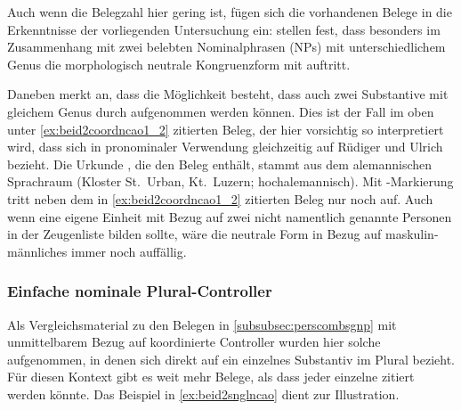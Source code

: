 Auch wenn die Belegzahl hier gering ist, fügen sich die vorhandenen Belege in
die Erkenntnisse der vorliegenden Untersuchung ein:
\textcites[39--40]{behaghel1928}[118]{dal2014} stellen fest, dass besonders im
Zusammenhang mit zwei belebten Nominalphrasen (NPs) mit unterschiedlichem Genus
die morphologisch neutrale Kongruenzform mit  auftritt.

\label{phsec:jungherren}
Daneben merkt \textcite[384]{paul2007} an, dass die Möglichkeit besteht, dass
auch zwei Substantive mit gleichem Genus durch
 aufgenommen werden können. Dies ist der Fall im oben unter
\cref{ex:beid2coordncao1_2} zitierten Beleg, der hier vorsichtig so
interpretiert wird, dass sich   in pronominaler Verwendung
gleichzeitig auf Rüdiger und Ulrich bezieht. Die Urkunde \citet[2915]{cao4},
die den Beleg enthält, stammt aus dem alemannischen Sprachraum (Kloster
St.~Urban, Kt.~Luzern; hochalemannisch). Mit
-Markierung tritt neben dem in \cref{ex:beid2coordncao1_2} zitierten
Beleg nur noch  
\autocite[\pno~2915, 213.27]{cao4} auf. Auch wenn 
 eine eigene Einheit mit Bezug auf zwei nicht namentlich
genannte Personen in der Zeugenliste bilden sollte, wäre die neutrale Form
 in Bezug auf maskulin-männliches  immer noch
auffällig.

\subsubsection{Einfache nominale Plural-Controller}
\label{subsubsec:persplnp}

Als Vergleichsmaterial zu den Belegen in \cref{subsubsec:perscombsgnp} mit
unmittelbarem Bezug auf koordinierte Controller wurden hier solche
aufgenommen, in denen sich  direkt auf ein einzelnes Substantiv im
Plural bezieht. Für diesen Kontext gibt es weit mehr Belege, als dass jeder
einzelne zitiert werden könnte. Das Beispiel in \cref{ex:beid2snglncao} dient
zur Illustration.

